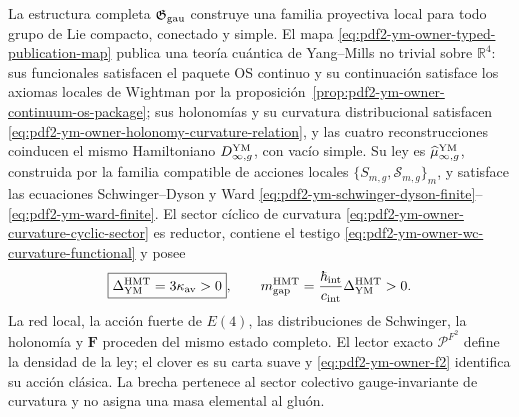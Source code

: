 \begin{theorem}
\label{thm:pdf2-ym-cierre-global}
La estructura completa $\mathfrak G_{\rm gau}$ construye una familia proyectiva
local para todo grupo de Lie compacto, conectado y simple. El mapa
\eqref{eq:pdf2-ym-owner-typed-publication-map} publica una teoría cuántica de
Yang--Mills no trivial sobre $\mathbb R^4$: sus funcionales satisfacen el paquete OS
continuo y su continuación satisface los axiomas locales de Wightman por la
proposición~\ref{prop:pdf2-ym-owner-continuum-os-package}; sus
holonomías y su curvatura
distribucional satisfacen
\eqref{eq:pdf2-ym-owner-holonomy-curvature-relation}, y las cuatro reconstrucciones
coinducen el mismo Hamiltoniano $D_{\infty,g}^{\rm YM}$, con vacío simple. Su ley es
$\widehat\mu_{\infty,g}^{\rm YM}$, construida por la familia compatible de acciones
locales $\{S_{m,g},\mathscr S_{m,g}\}_m$, y
satisface las ecuaciones Schwinger--Dyson y Ward
\eqref{eq:pdf2-ym-schwinger-dyson-finite}--\eqref{eq:pdf2-ym-ward-finite}. El sector
cíclico de curvatura
\eqref{eq:pdf2-ym-owner-curvature-cyclic-sector} es reductor, contiene el testigo
\eqref{eq:pdf2-ym-owner-wc-curvature-functional} y posee
\begin{equation}\label{eq:pdf2-ym-final-gap}
 \boxed{\Delta_{\rm YM}^{\rm HMT}=3\kappa_{\rm av}>0},
 \qquad
 m_{\rm gap}^{\rm HMT}
 =\frac{\hbar_{\rm int}}{c_{\rm int}}\Delta_{\rm YM}^{\rm HMT}>0.
\end{equation}
La red local, la acción fuerte de $E(4)$, las distribuciones de Schwinger, la
holonomía y $\mathbf F$ proceden del mismo estado completo. El lector exacto
$\mathcal P^{F^2}$ define la densidad de la ley; el clover es su carta suave y
\eqref{eq:pdf2-ym-owner-f2} identifica su acción clásica. La brecha pertenece al sector colectivo
gauge-invariante de curvatura y no asigna una masa elemental al gluón.
\end{theorem}

